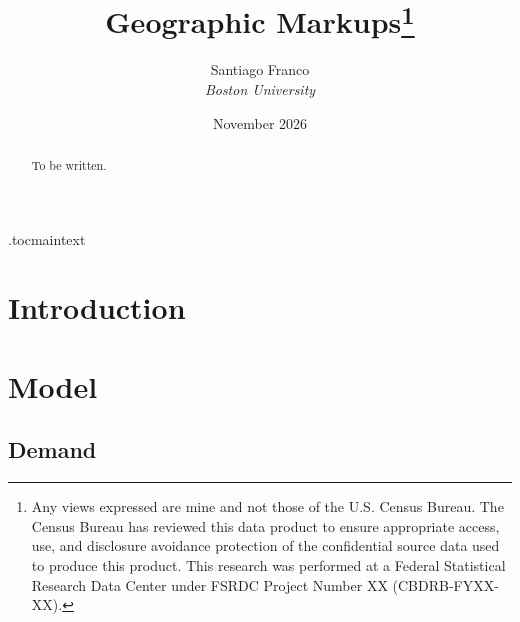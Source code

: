


\title{\textbf{Geographic Markups}\footnote{Any views expressed are mine and not those of the U.S. Census Bureau.
The Census Bureau has reviewed this data product to ensure appropriate access, use, and disclosure avoidance protection of the confidential source data used to produce this product.
This research was performed at a Federal Statistical Research Data Center under FSRDC Project Number XX (CBDRB-FYXX-XX).}}

\author{Santiago Franco \\ \textit{Boston University}}

\date{November 2026}



\maketitle

\thispagestyle{empty}

\begin{abstract}
\noindent To be written.
\end{abstract}

\clearpage
{}

\etocdepthtag.toc{maintext}



\section{Introduction}\label{sec:intro}




\section{Model}\label{sec:model}

\subsection{Demand}\label{sec:demand}

